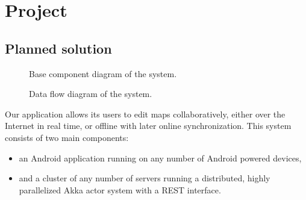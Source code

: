 %
%
%
%
%

\chapter{Project}
\label{chap:project}



\section{Planned solution}
\label{sec:plan}

\begin{figure}[h]
	\centering
	\caption{Base component diagram of the system.}
	\label{fig:diagram-components-system}
\end{figure}

\begin{figure}[h]
	\centering
	\caption{Data flow diagram of the system.}
	\label{fig:diagram-dfd}
\end{figure}

Our application allows its users to edit maps collaboratively, either over the Internet in real time, or offline with later online synchronization. This system consists of two main components:

\begin{itemize}
	\item an Android application running on any number of Android powered devices,
	\item and a cluster of any number of servers running a distributed, highly parallelized Akka actor system with a REST interface.
\end{itemize}





